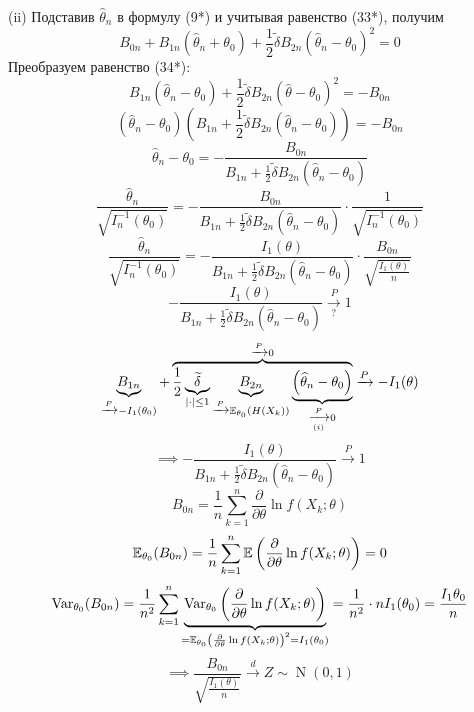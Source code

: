 \documentclass[a4paper,11pt]{article}
\begin{document}
{    (ii) Подставив $\widehat{\theta}_n$ в формулу (9*) и учитывая равенство (33*), получим
    \[B_{0n} + B_{1n}\left(\widehat{\theta}_n + \theta_0\right) + \frac{1}{2}\widetilde{\delta}B_{2n}\left(\widehat{\theta}_n - \theta_0\right)^2 = 0 \tag{34*}\]
    Преобразуем равенство (34*):
    \[B_{1n}\left(\widehat{\theta}_n - \theta_0\right) + \frac{1}{2}\widetilde{\delta}B_{2n}\left(\widehat{\theta} - \theta_0\right)^2 = -B_{0n}\]
    \[\left(\widehat{\theta}_n - \theta_0\right)\left(B_{1n} + \frac{1}{2}\widetilde{\delta}B_{2n}\left(\widehat{\theta}_n - \theta_0\right)\right) = -B_{0n}\]
    \[\widehat{\theta}_n - \theta_0 = -\frac{B_{0n}}{B_{1n} + \frac{1}{2}\widetilde{\delta}B_{2n}\left(\widehat{\theta}_n - \theta_0\right)}\]
    \[\frac{\widehat{\theta}_n}{\sqrt{I_n^{-1}(\theta_0)}} = -\frac{B_{0n}}{B_{1n} + \frac{1}{2}\widetilde{\delta}B_{2n}\left(\widehat{\theta}_n - \theta_0\right)} \cdot \frac{1}{\sqrt{I_n^{-1}(\theta_0)}}\]
    \[\frac{\widehat{\theta}_n}{\sqrt{I_n^{-1}(\theta_0)}} = -\frac{I_1(\theta)}{B_{1n} + \frac{1}{2}\widetilde{\delta}B_{2n}\left(\widehat{\theta}_n - \theta_0\right)} \cdot \frac{B_{0n}}{\sqrt{\frac{I_1(\theta)}{n}}} \tag{35*}\]
    \[-\frac{I_1(\theta)}{B_{1n} + \frac{1}{2}\widetilde{\delta}B_{2n}\left(\widehat{\theta}_n - \theta_0\right)} \xrightarrow[?]{P} 1\]
    \[\underbrace{B_{1n}}_{\xrightarrow{P}-I_1(\theta_0)} + \overbrace{\frac{1}{2}\underbrace{\widetilde{\delta}}_{|\cdot|\leq 1}\underbrace{B_{2n}}_{\xrightarrow{P}\mathbb{E}_{\theta_0}(H(X_k))}\underbrace{\left(\widehat{\theta}_n - \theta_0\right)}_{\xrightarrow[(i)]{P} 0}}^{\xrightarrow{P} 0} \xrightarrow{P} -I_1(\theta)\]
    \[\implies -\frac{I_1(\theta)}{B_{1n} + \frac{1}{2}\widetilde{\delta}B_{2n}\left(\widehat{\theta}_n - \theta_0\right)} \xrightarrow{P} 1\]
    \[B_{0n} = \frac{1}{n}\sum_{k=1}^{n}\frac{\partial}{\partial \theta}\ln f(X_k;\theta)\]
    \[\mathbb{E}_{\theta_0}(B_{0n}) = \frac{1}{n}\sum_{k=1}^{n}\mathbb{E}\left(\frac{\partial}{\partial \theta}\ln f(X_k;\theta)\right) = 0\]
    \[\operatorname{Var}_{\theta_0}(B_{0n}) = \frac{1}{n^2}\sum_{k=1}^{n}\underbrace{\operatorname{Var}_{\theta_0}\left(\frac{\partial}{\partial \theta}\ln f(X_k;\theta)\right)}_{=\mathbb{E}_{\theta_0}\left(\frac{\partial}{\partial \theta}\ln f(X_k;\theta)\right)^2 = I_1(\theta_0)} = \frac{1}{n^2} \cdot nI_1(\theta_0) = \frac{I_1{\theta_0}}{n}\]
    \[\implies \frac{B_{0n}}{\sqrt{\frac{I_1(\theta)}{n}}} \xrightarrow{d} Z \sim \operatorname{N}(0, 1)\]
}

\setcounter{maindf}{10}
\setcounter{subdf}{0}

\setcounter{mainth}{10}
\setcounter{subth}{0}
\end{document}
